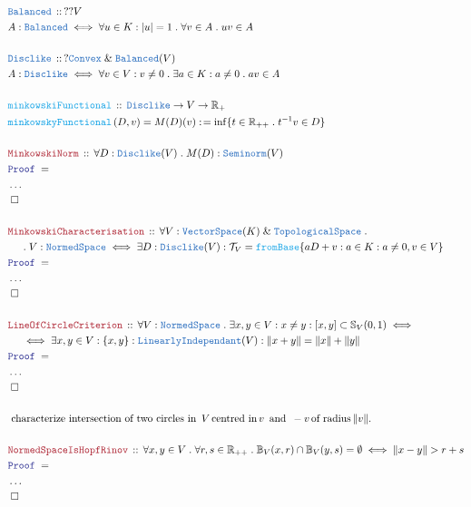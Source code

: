 \documentclass[12pt]{scrartcl}
\newcommand{\TYPE}[1]{\textcolor{NavyBlue}{\mathtt{#1}}}
\newcommand{\FUNC}[1]{\textcolor{Cerulean}{\mathtt{#1}}}
\newcommand{\LOGIC}[1]{\textcolor{Blue}{\mathtt{#1}}}
\newcommand{\THM}[1]{\textcolor{Maroon}{\mathtt{#1}}}
\renewcommand{\.}{\; . \;}
\newcommand{\de}{: \kern 0.1pc =}
\newcommand{\Act}[1]{\left( #1 \right)}
\newcommand{\Theorem}[2]{& \THM{#1} \, :: \, #2 \\ & \Proof = \\ }
\newcommand{\DeclareType}[2]{& \TYPE{#1} \, :: \, #2 \\}
\newcommand{\DefineType}[3]{& #1 : \TYPE{#2} \iff #3 \\}
\newcommand{\DeclareFunc}[2]{& \FUNC{#1} \, :: \, #2 \\}
\newcommand{\DefineNamedFunc}[4]{&  \FUNC{#1}\Act{#2} = #3 \de #4 \\}
\newcommand{\NewLine}{\\ & \kern 1pc}
\newcommand{\Page}[1]{\begin{align*} #1 \end{align*} \newpage   }
\newcommand{\NoProof}{ & \ldots \\ \EndProof}
\renewcommand{\And}{\; \& \;}
\newcommand{\Reals}{\mathbb{R} }
\newcommand{\QED}{\; \square}
\newcommand{\EndProof}{& \QED \\}
\newcommand{\Proof}{\LOGIC{Proof} \; }
\newcommand{\TS}{\TYPE{TopologicalSpace}}
\newcommand{\NS}{\TYPE{NormedSpace}}
\begin{document}
\Page{ 
 \DeclareType{Balanced}{ ?? V}
 \DefineType{A}{Balanced}{ \forall u \in K : |u| = 1 \. \forall v \in A \. uv \in A }
\\
\DeclareType{Disclike}{?\TYPE{Convex} \And \TYPE{Balanced}(V) }
\DefineType{A}{Disclike}{ \forall v \in V : v \neq 0 \. \exists a \in K : a \neq 0 \. av \in A }
\\ 
\DeclareFunc{minkowskiFunctional}{ \TYPE{Disclike} \to V \to \Reals_+  }
\DefineNamedFunc{minkowskyFunctional}{D,v}{ M(D)(v)  }{  \inf \{ t \in \Reals_{++} \. t^{-1}v \in D   \}  }  
\\
\Theorem{MinkowskiNorm}{ \forall D : \TYPE{Disclike}(V) \. M(D) : \TYPE{Seminorm}(V) }
\NoProof
\\
\Theorem{MinkowskiCharacterisation}{ \forall V : \TYPE{VectorSpace}(K) \And \TS \. 
 \NewLine \. V : \NS 
\iff \exists D : \TYPE{Disclike}(V) : \mathcal{T}_V = \FUNC{fromBase}\{ aD + v : a \in K : a \neq 0 , v \in V \} }
\NoProof
\\
\Theorem{LineOfCircleCriterion}
{\forall V  : \NS \. \exists x,y \in V : x \neq y : [x,y] \subset \mathbb{S}_V(0,1) 
\iff \NewLine \iff
\exists x,y \in V : \{x,y\} : \TYPE{LinearlyIndependant}(V) : \| x + y \| = \| x \| + \| y \| 
}
\NoProof
\\
& \text{ characterize intersection of two circles in } \, V \, \text{centred in} \, v \, \text{ and }
\, -v \, \text{of radius} \, \| v \| . \\
\\
\Theorem{NormedSpaceIsHopfRinov}{ \forall x,y \in V \. \forall r,s \in \Reals_{++} \.
\mathbb{B}_V(x,r) \cap \mathbb{B}_V(y,s) = \emptyset \iff  \| x - y \| > r + s
}
\NoProof
}
\end{document}

